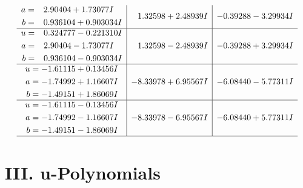 \documentclass[1p]{elsarticle_modified}
\theoremstyle{definition}
\begin{document}
$$\begin{array}{c|c|c}
\begin{aligned}
a &= \phantom{-}2.90404 + 1.73077 I \\
b &= \phantom{-}0.936104 + 0.903034 I\end{aligned}
 & \phantom{-}1.32598 + 2.48939 I & -0.39288 - 3.29934 I \\ \hline\begin{aligned}
u &= \phantom{-}0.324777 - 0.221310 I \\
a &= \phantom{-}2.90404 - 1.73077 I \\
b &= \phantom{-}0.936104 - 0.903034 I\end{aligned}
 & \phantom{-}1.32598 - 2.48939 I & -0.39288 + 3.29934 I \\ \hline\begin{aligned}
u &= -1.61115 + 0.13456 I \\
a &= -1.74992 + 1.16607 I \\
b &= -1.49151 + 1.86069 I\end{aligned}
 & -8.33978 + 6.95567 I & -6.08440 - 5.77311 I \\ \hline\begin{aligned}
u &= -1.61115 - 0.13456 I \\
a &= -1.74992 - 1.16607 I \\
b &= -1.49151 - 1.86069 I\end{aligned}
 & -8.33978 - 6.95567 I & -6.08440 + 5.77311 I\\
 \hline 
 \end{array}$$\newpage
\newpage\renewcommand{\arraystretch}{1}
\centering \section*{ III. u-Polynomials}
\end{document}

